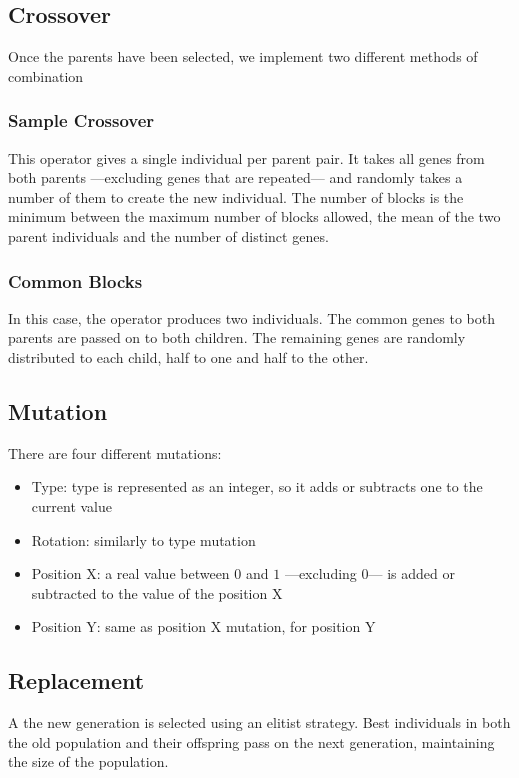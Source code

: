 \subsection{Crossover}

Once the parents have been selected, we implement two different methods of combination

\subsubsection{Sample Crossover}

This operator gives a single individual per parent pair. It takes all genes from both parents ---excluding genes that are repeated--- and randomly takes a number of them to create the new individual. The number of blocks is the minimum between the maximum number of blocks allowed, the mean of the two parent individuals and the number of distinct genes.

\subsubsection{Common Blocks}

In this case, the operator produces two individuals. The common genes to both parents are passed on to both children. The remaining genes are randomly distributed to each child, half to one and half to the other. 

\subsection{Mutation}

There are four different mutations:

\begin{itemize}
	\item Type: type is represented as an integer, so it adds or subtracts one to the current value
	\item Rotation: similarly to type mutation
	\item Position X: a real value between $0$ and $1$ ---excluding $0$--- is added or subtracted to the value of the position X
	\item Position Y: same as position X mutation, for position Y
\end{itemize}

\subsection{Replacement}

A the new generation is selected using an elitist strategy. Best individuals in both the old population and their offspring pass on the next generation, maintaining the size of the population.


